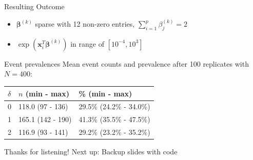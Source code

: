 \documentclass{beamer}
\providecommand{\tightlist}{%
  \setlength{\itemsep}{0pt}\setlength{\parskip}{0pt}}
\begin{document}
\begin{frame}{Resulting Outcome}
\protect\hypertarget{resulting-outcome}{}
\begin{itemize}
\tightlist
\item
  \(\pmb{\beta}^{(k)}\) sparse with 12 non-zero entries,
  \(\sum_{i = 1}^p \beta^{(k)}_j = 2\)
\end{itemize}

\begin{itemize}
\tightlist
\item
  \(\exp(\mathbf{x}^{T}_i\pmb{\beta}^{(k)})\) in range of
  \([10^{-4}, 10^{3}]\)
\end{itemize}

\begin{block}{Event prevalences}
\protect\hypertarget{event-prevalences}{}
Mean event counts and prevalence after 100 replicates with \(N = 400\):

\begin{table}
\centering
\begin{tabular}{l|l|l}
\hline
$\delta$ & $n$ (min - max) & \% (min - max)  \\
\hline
0 & 118.0 (97 - 136) & 29.5\% (24.2\% - 34.0\%)\\
\hline
1 & 165.1 (142 - 190) & 41.3\% (35.5\% - 47.5\%)\\
\hline
2 & 116.9 (93 - 141) & 29.2\% (23.2\% - 35.2\%)\\
\hline
\end{tabular}
\end{table}
\end{block}
\end{frame}

\begin{frame}{Thanks for listening!}
\protect\hypertarget{thanks-for-listening}{}
Next up: Backup slides with code
\end{frame}
\end{document}
